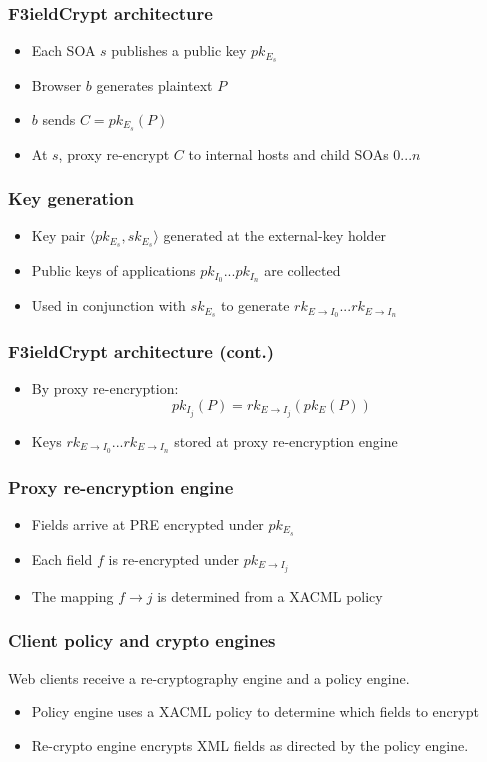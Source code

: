 \documentclass{beamer}
\begin{document}
\begin{frame}
\frametitle{F3ieldCrypt architecture}
\begin{itemize}
\item Each SOA $s$ publishes a public key $pk_{E_s}$
\item Browser $b$ generates plaintext $P$
\item $b$ sends $C = pk_{E_s}(P)$ 
\item At $s$, proxy re-encrypt $C$ to internal hosts and child SOAs $0...n$ 
\end{itemize}
\end{frame}

\begin{frame}
\frametitle{Key generation}
\begin{itemize}
\item Key pair $\langle pk_{E_s}, sk_{E_s} \rangle$ generated at the
\alert{external-key holder}
\item Public keys of applications $pk_{I_0}...pk_{I_n}$ are collected
\item Used in conjunction with $sk_{E_s}$ to generate $rk_{E \to I_0}...rk_{E
\to I_n}$
\end{itemize}
\end{frame}

\begin{frame}
\frametitle{F3ieldCrypt architecture (cont.)}
\begin{itemize}
\item By proxy re-encryption:
\begin{equation*}
pk_{I_j}(P) = rk_{E \to I_j}( pk_E (P))
\end{equation*}
\item Keys $rk_{E \to I_0}...rk_{E \to I_n}$ stored at \alert{proxy
re-encryption engine}
\end{itemize}
\end{frame}

\begin{frame}
\frametitle{Proxy re-encryption engine}
\begin{itemize}
\item Fields arrive at PRE encrypted under $pk_{E_s}$
\item Each field $f$ is re-encrypted under $pk_{E \to I_j}$
\item The mapping $f \to j$ is determined from a XACML policy
\end{itemize}
\end{frame}

\begin{frame}
\frametitle{Client policy and crypto engines}
Web clients receive a re-cryptography engine and a policy engine. 
\medskip
\begin{itemize}
\item \alert{Policy engine} uses a XACML policy to determine which fields to
encrypt
\item \alert{Re-crypto engine} encrypts XML fields as directed by the policy
engine.
\end{itemize}
\end{frame}
\end{document}
